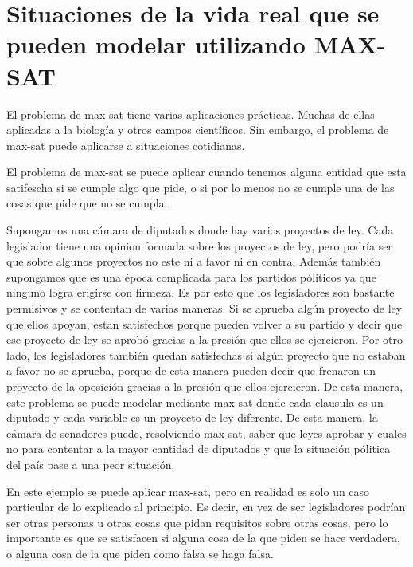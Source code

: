 \documentclass[a4paper,10pt]{article}
\begin{document}
\section*{Situaciones de la vida real que se pueden modelar utilizando MAX-SAT}

El problema de max-sat tiene varias aplicaciones pr\'acticas. Muchas de ellas aplicadas a la biolog\'ia y otros campos cient\'ificos. Sin embargo, el problema de max-sat puede aplicarse a situaciones cotidianas.

El problema de max-sat se puede aplicar cuando tenemos alguna entidad que esta satifescha si se cumple algo que pide, o si por lo menos no se cumple una de las cosas que pide que no se cumpla.

Supongamos una c\'amara de diputados donde hay varios proyectos de ley. Cada legislador tiene una opinion formada sobre los proyectos de ley, pero podr\'ia ser que sobre algunos proyectos no este ni a favor ni en contra. Adem\'as tambi\'en supongamos que es una \'epoca complicada para los partidos p\'oliticos ya que ninguno logra erigirse con firmeza. Es por esto que los legisladores son bastante permisivos y se contentan de varias maneras. Si se aprueba alg\'un proyecto de ley que ellos apoyan, estan satisfechos porque pueden volver a su partido y decir que ese proyecto de ley se aprob\'o gracias a la presi\'on que ellos se ejercieron. Por otro lado, los legisladores tambi\'en quedan satisfechas si alg\'un proyecto que no estaban a favor no se aprueba, porque de esta manera pueden decir que frenaron un proyecto de la oposici\'on gracias a la presi\'on que ellos ejercieron. De esta manera, este problema se puede modelar mediante max-sat donde cada clausula es un diputado y cada variable es un proyecto de ley diferente. De esta manera, la c\'amara de senadores puede, resolviendo max-sat, saber que leyes aprobar y cuales no para contentar a la mayor cantidad de diputados y que la situaci\'on p\'olitica del pa\'is pase a una peor situaci\'on.


En este ejemplo se puede aplicar max-sat, pero en realidad es solo un caso particular de lo explicado al principio. Es decir, en vez de ser legisladores podr\'ian ser otras personas u otras cosas que pidan requisitos sobre otras cosas, pero lo importante es que se satisfacen si alguna cosa de la que piden se hace verdadera, o alguna cosa de la que piden como falsa se haga falsa.


\bigskip
\end{document}

